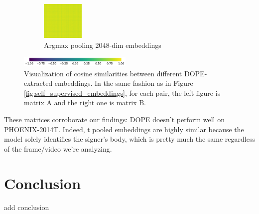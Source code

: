 \documentclass[final]{cvpr}
\begin{document}
\begin{figure}[h]
\begin{subfigure}[t]{0.5\linewidth}
		\includegraphics[height=1.8cm]{fig/matrices/b_amax.png}
		\caption{\centering Argmax pooling $2048$-dim embeddings}
	\end{subfigure}\hfill
	\par\medskip
	\centering
	\includegraphics[width=0.48\textwidth]{fig/colorbar}
	\caption{Visualization of cosine similarities between different DOPE-extracted embeddings. In the same fashion as in Figure \ref*{fig:self_supervised_embeddings}, for each pair, the left figure is matrix A and the right one is matrix B.}
	\label{fig:DOPE_embeddings}
\end{figure}

These matrices corroborate our findings: DOPE doesn't perform well on PHOENIX-2014T. Indeed, t pooled embeddings are highly similar because the model solely identifies the signer's body, which is pretty much the same regardless of the frame/video we're analyzing.
\section{Conclusion}
add conclusion
{\small


}
\end{document}
